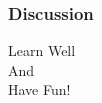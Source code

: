 \documentclass[12pt, t]{beamer}
\begin{document}
\begin{frame}
    \frametitle{Discussion}
    \vspace{1.5cm}
    \Large
    \centering
    Learn Well\\
    And\\
    Have Fun!\\


\end{frame}
\end{document}
